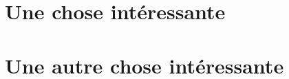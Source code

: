 
\chapter{Une chose intéressante}
\label{ann:1}


\chapter{Une autre chose intéressante}
\label{ann:2}
